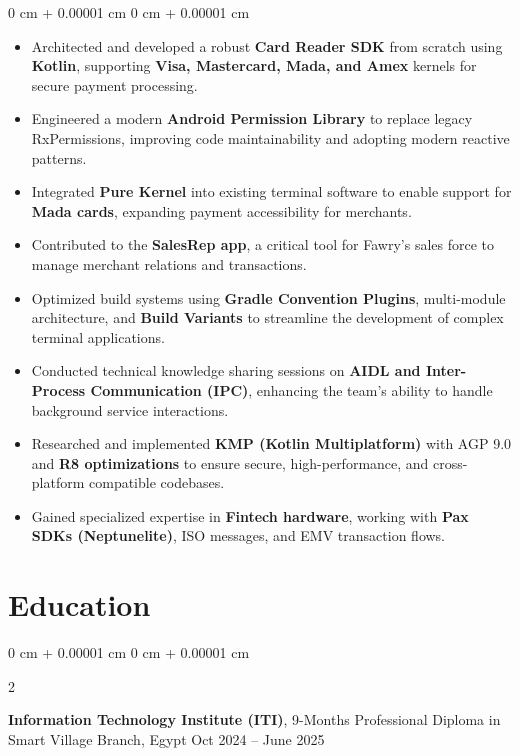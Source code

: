 \documentclass[10pt, letterpaper]{article}
\newenvironment{highlights}{
    \begin{itemize}[
        topsep=0.10 cm,
        parsep=0.10 cm,
        partopsep=0pt,
        itemsep=0pt,
        leftmargin=0 cm + 10pt
    ]
}{
    \end{itemize}
} %
\newenvironment{onecolentry}{
    \begin{adjustwidth}{
        0 cm + 0.00001 cm
    }{
        0 cm + 0.00001 cm
    }
}{
    \end{adjustwidth}
} %
\newenvironment{twocolentry}[2][]{
    \onecolentry
    \def\secondColumn{#2}
    \setcolumnwidth{\fill, 4.5 cm}
    \begin{paracol}{2}
}{
    \switchcolumn \raggedleft \secondColumn
    \end{paracol}
    \endonecolentry
} %
\begin{document}
        \vspace{0.10 cm}
        \begin{onecolentry}
            \begin{highlights}
                \item Architected and developed a robust \textbf{Card Reader SDK} from scratch using \textbf{Kotlin}, supporting \textbf{Visa, Mastercard, Mada, and Amex} kernels for secure payment processing.
                \item Engineered a modern \textbf{Android Permission Library} to replace legacy RxPermissions, improving code maintainability and adopting modern reactive patterns.
                \item Integrated \textbf{Pure Kernel} into existing terminal software to enable support for \textbf{Mada cards}, expanding payment accessibility for merchants.
                \item Contributed to the \textbf{SalesRep app}, a critical tool for Fawry's sales force to manage merchant relations and transactions.
                \item Optimized build systems using \textbf{Gradle Convention Plugins}, multi-module architecture, and \textbf{Build Variants} to streamline the development of complex terminal applications.
                \item Conducted technical knowledge sharing sessions on \textbf{AIDL and Inter-Process Communication (IPC)}, enhancing the team's ability to handle background service interactions.
                \item Researched and implemented \textbf{KMP (Kotlin Multiplatform)} with AGP 9.0 and \textbf{R8 optimizations} to ensure secure, high-performance, and cross-platform compatible codebases.
                \item Gained specialized expertise in \textbf{Fintech hardware}, working with \textbf{Pax SDKs (Neptunelite)}, ISO messages, and EMV transaction flows.
            \end{highlights}
        \end{onecolentry}



    
    \section{Education}



        
        \begin{twocolentry}{
            Oct 2024 – June 2025
        }
            \textbf{Information Technology Institute (ITI)}, 9-Months Professional Diploma in Smart Village Branch, Egypt\end{twocolentry}
\end{document}
